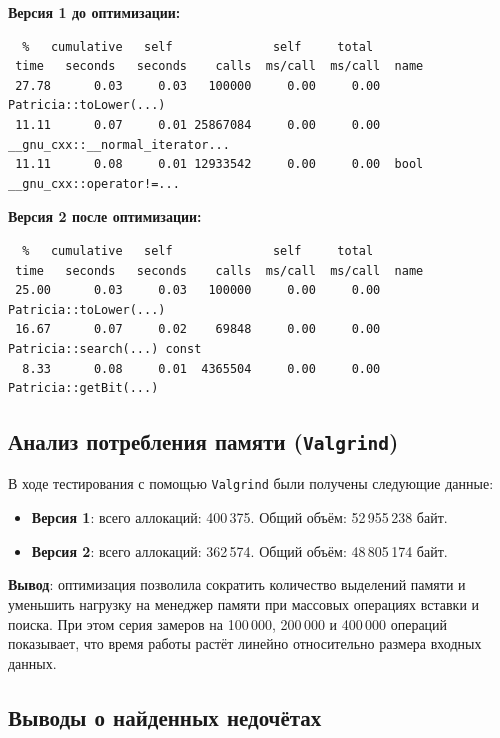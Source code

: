 \textbf{Версия 1 до оптимизации:}
\begin{verbatim}
  %   cumulative   self              self     total
 time   seconds   seconds    calls  ms/call  ms/call  name
 27.78      0.03     0.03   100000     0.00     0.00  Patricia::toLower(...)
 11.11      0.07     0.01 25867084     0.00     0.00  __gnu_cxx::__normal_iterator...
 11.11      0.08     0.01 12933542     0.00     0.00  bool __gnu_cxx::operator!=...
\end{verbatim}

\textbf{Версия 2 после оптимизации:}
\begin{verbatim}
  %   cumulative   self              self     total
 time   seconds   seconds    calls  ms/call  ms/call  name
 25.00      0.03     0.03   100000     0.00     0.00  Patricia::toLower(...)
 16.67      0.07     0.02    69848     0.00     0.00  Patricia::search(...) const
  8.33      0.08     0.01  4365504     0.00     0.00  Patricia::getBit(...)
\end{verbatim}

\subsection{Анализ потребления памяти (\texttt{Valgrind})}

В ходе тестирования с помощью \texttt{Valgrind} были получены следующие данные:

\begin{itemize}
    \item \textbf{Версия 1}: всего аллокаций: 400\,375. Общий объём: 52\,955\,238 байт.
    \item \textbf{Версия 2}: всего аллокаций: 362\,574. Общий объём: 48\,805\,174 байт.
\end{itemize}

\textbf{Вывод}: оптимизация позволила сократить количество выделений памяти и уменьшить нагрузку
на менеджер памяти при массовых операциях вставки и поиска. При этом серия замеров на
100\,000, 200\,000 и 400\,000 операций показывает, что время работы растёт линейно относительно
размера входных данных.

\subsection{Выводы о найденных недочётах}

